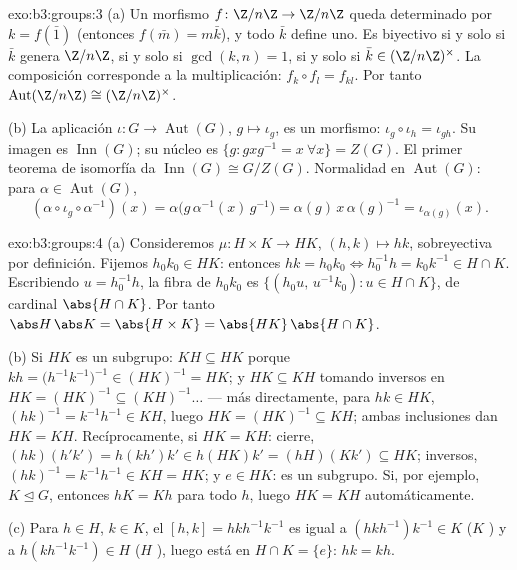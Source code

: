 \begin{solution}{exo:b3:groups:3}
(a) Un morfismo $f \colon \Z/n\Z \to \Z/n\Z$ queda determinado por $k =
f(\bar 1)$ (entonces $f(\bar m) = m\bar k$), y todo $\bar k$ define uno.
Es biyectivo si y solo si $\bar k$ genera $\Z/n\Z$, si y solo si
$\gcd(k,n) = 1$, si y solo si $\bar k \in (\Z/n\Z)^\times$. La
composición corresponde a la multiplicación: $f_k \circ f_l = f_{kl}$.
Por tanto
$\operatorname{Aut}(\Z/n\Z) \cong (\Z/n\Z)^\times$.

(b) La aplicación $\iota\colon G \to \operatorname{Aut}(G)$, $g \mapsto
\iota_g$, es un morfismo: $\iota_g \circ \iota_h = \iota_{gh}$. Su
imagen es $\operatorname{Inn}(G)$; su núcleo es $\{g : gxg^{-1} =
x\ \forall x\} = Z(G)$. El primer teorema de isomorfía da
$\operatorname{Inn}(G) \cong G/Z(G)$. Normalidad en
$\operatorname{Aut}(G)$: para $\alpha \in \operatorname{Aut}(G)$,
\[
(\alpha \circ \iota_g \circ \alpha^{-1})(x)
= \alpha\bigl(g\,\alpha^{-1}(x)\,g^{-1}\bigr)
= \alpha(g)\, x\, \alpha(g)^{-1} = \iota_{\alpha(g)}(x).
\]
\end{solution}

\begin{solution}{exo:b3:groups:4}
(a) Consideremos $\mu \colon H \times K \to HK$, $(h,k) \mapsto hk$,
sobreyectiva por definición. Fijemos $h_0k_0 \in HK$: entonces
$hk = h_0k_0
\iff h_0^{-1}h = k_0 k^{-1} \in H \cap K$. Escribiendo $u =
h_0^{-1}h$, la fibra de $h_0k_0$ es $\{(h_0u,\, u^{-1}k_0) : u
\in H \cap K\}$, de cardinal $\abs{H \cap K}$. Por tanto $\abs
H\,\abs K = \abs{H\times K} = \abs{HK}\,\abs{H \cap K}$.

(b) Si $HK$ es un subgrupo: $KH \subseteq HK$ porque $kh =
\bigl(h^{-1}k^{-1}\bigr)^{-1} \in (HK)^{-1} = HK$; y $HK
\subseteq KH$ tomando inversos en $HK = (HK)^{-1} \subseteq
(KH)^{-1}\dots$ --- más directamente, para $hk \in HK$, $(hk)^{-1} =
k^{-1}h^{-1} \in KH$, luego $HK = (HK)^{-1} \subseteq KH$; ambas
inclusiones dan $HK = KH$. Recíprocamente, si $HK = KH$: cierre,
$(hk)(h'k') = h(kh')k' \in h(HK)k' = (hH)(Kk') \subseteq HK$;
inversos, $(hk)^{-1} = k^{-1}h^{-1} \in KH = HK$; y $e \in HK$: es un
subgrupo. Si, por ejemplo, $K \trianglelefteq G$, entonces $hK = Kh$
para todo $h$, luego $HK = KH$ automáticamente.

(c) Para $h \in H$, $k \in K$, el
 $[h,k] = hkh^{-1}
k^{-1}$ es igual a $(hkh^{-1})k^{-1} \in K$ ($K$
) y a $h(kh^{-1}k^{-1}) \in H$ ($H$
), luego está en $H \cap K =
\{e\}$: $hk = kh$.
\end{solution}


